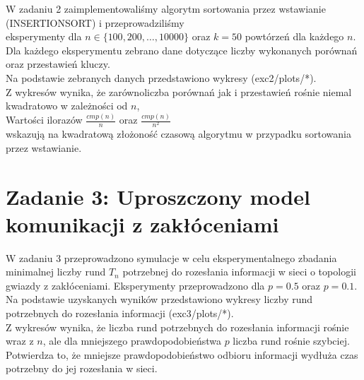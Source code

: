 \documentclass{article}
\begin{document}
W zadaniu 2 zaimplementowaliśmy algorytm sortowania przez wstawianie (INSERTIONSORT) i przeprowadziliśmy \\
eksperymenty dla \(n \in \{100, 200, \dots, 10 000\}\) oraz \(k = 50\) powtórzeń dla każdego \(n\). \\
Dla każdego eksperymentu zebrano dane dotyczące liczby wykonanych porównań oraz przestawień kluczy.\\

Na podstawie zebranych danych przedstawiono wykresy (exc2/plots/*). \\

Z wykresów wynika, że zarównoliczba porównań jak i przestawień rośnie niemal kwadratowo w zależności od \(n\), \\
Wartości ilorazów \(\frac{cmp(n)}{n}\) oraz \(\frac{cmp(n)}{n^2}\) \\
wskazują na kwadratową złożoność czasową algorytmu w przypadku sortowania przez wstawianie.\\

\section*{Zadanie 3: Uproszczony model komunikacji z zakłóceniami}

W zadaniu 3 przeprowadzono symulacje w celu eksperymentalnego zbadania minimalnej liczby rund \(T_n\) potrzebnej do rozesłania informacji w sieci 
o topologii gwiazdy z zakłóceniami. Eksperymenty przeprowadzono dla \(p = 0.5\) oraz \(p = 0.1\).\\

Na podstawie uzyskanych wyników przedstawiono wykresy liczby rund potrzebnych do rozesłania informacji (exc3/plots/*).\\

Z wykresów wynika, że liczba rund potrzebnych do rozesłania informacji rośnie wraz z \(n\), ale dla mniejszego prawdopodobieństwa \(p\) liczba rund rośnie szybciej. \\
Potwierdza to, że mniejsze prawdopodobieństwo odbioru informacji wydłuża czas potrzebny do jej rozesłania w sieci.\\
\end{document}
